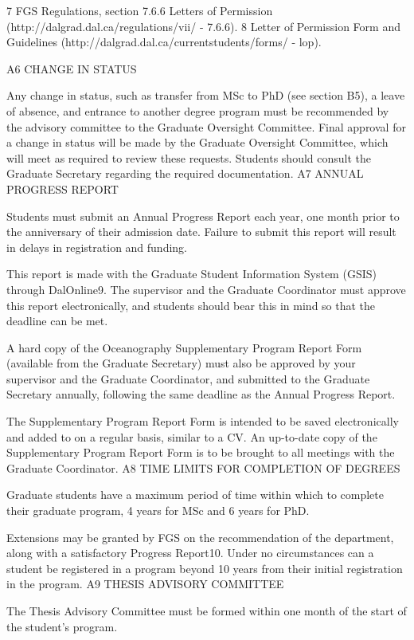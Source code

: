 7 FGS Regulations, section 7.6.6 Letters of Permission (http://dalgrad.dal.ca/regulations/vii/ - 7.6.6).
8 Letter of Permission Form and Guidelines (http://dalgrad.dal.ca/currentstudents/forms/ - lop).
 

A6	CHANGE IN STATUS

Any change in status, such as transfer from MSc to PhD (see section B5), a leave of absence, and entrance to another degree program must be recommended by the advisory committee to the Graduate Oversight Committee. Final approval for a change in status will be made by the Graduate Oversight Committee, which will meet as required to review these requests. Students should consult the Graduate Secretary regarding the required documentation.
A7	ANNUAL PROGRESS REPORT

Students must submit an Annual Progress Report each year, one month prior to the anniversary of their admission date. Failure to submit this report will result in delays in registration and funding.

This report is made with the Graduate Student Information System (GSIS) through DalOnline9. The supervisor and the Graduate Coordinator must approve this report electronically, and students should bear this in mind so that the deadline can be met.

A hard copy of the Oceanography Supplementary Program Report Form (available from the Graduate Secretary) must also be approved by your supervisor and the Graduate Coordinator, and submitted to the Graduate Secretary annually, following the same deadline as the Annual Progress Report.

The Supplementary Program Report Form is intended to be saved electronically and added to on a regular basis, similar to a CV. An up-to-date copy of the Supplementary Program Report Form is to be brought to all meetings with the Graduate Coordinator.
A8	TIME LIMITS FOR COMPLETION OF DEGREES

Graduate students have a maximum period of time within which to complete their graduate program, 4 years for MSc and 6 years for PhD.

Extensions may be granted by FGS on the recommendation of the department, along with a satisfactory Progress Report10. Under no circumstances can a student be registered in a program beyond 10 years from their initial registration in the program.
A9	THESIS ADVISORY COMMITTEE

The Thesis Advisory Committee must be formed within one month of the start of the student’s program.

